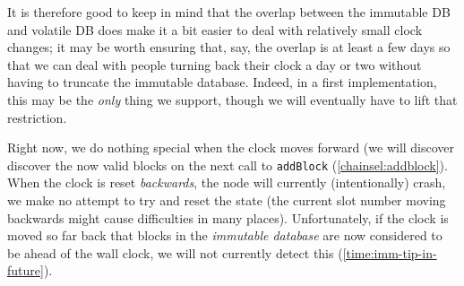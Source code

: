 It is therefore good to keep in mind that the overlap between the immutable DB
and volatile DB does make it a bit easier to deal with relatively small clock
changes; it may be worth ensuring that, say, the overlap is at least a few days
so that we can deal with people turning back their clock a day or two without
having to truncate the immutable database. Indeed, in a first implementation,
this may be the \emph{only} thing we support, though we will eventually have to
lift that restriction.

Right now, we do nothing special when the clock moves forward (we will discover
discover the now valid blocks on the next call to \lstinline!addBlock!
(\cref{chainsel:addblock}). When the clock is reset \emph{backwards}, the node
will currently (intentionally) crash, we make no attempt to try and reset
the state (the current slot number moving backwards might cause difficulties
in many places). Unfortunately, if the clock is moved so far back that blocks
in the \emph{immutable database} are now considered to be ahead of the wall
clock, we will not currently detect this (\cref{time:imm-tip-in-future}).
